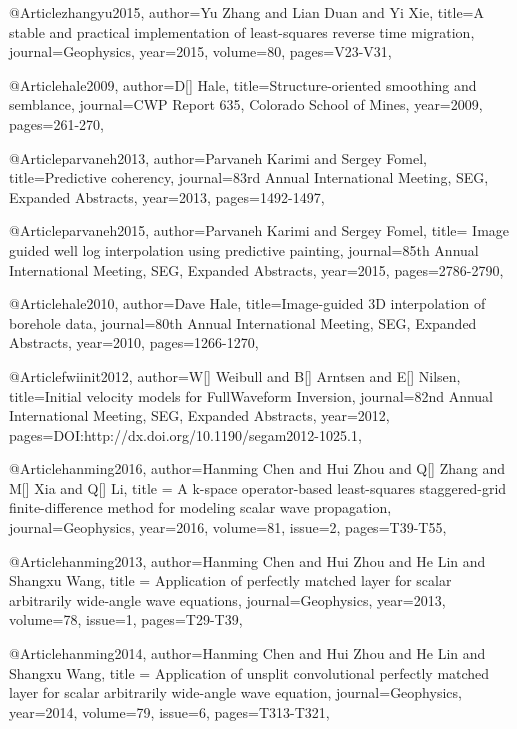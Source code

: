 {@Article{zhangyu2015,
  author={Yu Zhang and Lian Duan and Yi Xie},
  title={A stable and practical implementation of least-squares reverse time migration},
  journal={Geophysics},
  year=2015,
  volume=80,
  pages={V23-V31},
}
	




@Article{hale2009,
  author={D[] Hale},
  title={Structure-oriented smoothing and semblance},
  journal={CWP Report 635, Colorado School of Mines},
  year=2009,
  pages={261-270},
}


@Article{parvaneh2013,
  author={Parvaneh Karimi and Sergey Fomel},
  title={Predictive coherency},
  journal={83rd Annual International Meeting, SEG, Expanded Abstracts},
  year=2013,
  pages={1492-1497},
}

@Article{parvaneh2015,
  author={Parvaneh Karimi and Sergey Fomel},
  title={	Image guided well log interpolation using predictive painting},
  journal={85th Annual International Meeting, SEG, Expanded Abstracts},
  year=2015,
  pages={2786-2790},
}

@Article{hale2010,
  author={Dave Hale},
  title={Image-guided 3{D} interpolation of borehole data},
  journal={80th Annual International Meeting, SEG, Expanded Abstracts},
  year=2010,
  pages={1266-1270},
}

@Article{fwiinit2012,
  author={W[] Weibull and B[] Arntsen and E[] Nilsen},
  title={Initial velocity models for FullWaveform Inversion},
  journal={82nd Annual International Meeting, SEG, Expanded Abstracts},
  year=2012,
  pages={DOI:http://dx.doi.org/10.1190/segam2012-1025.1},
}






@Article{hanming2016,
  author={Hanming Chen and Hui Zhou and Q[] Zhang and M[] Xia and Q[] Li},
  title = {A k-space operator-based least-squares staggered-grid finite-difference method for modeling scalar wave propagation},
  journal={Geophysics},
  year=2016,
  volume=81,
  issue=2,
  pages={T39-T55},
}

@Article{hanming2013,
  author={Hanming Chen and Hui Zhou and He Lin and Shangxu Wang},
  title = {Application of perfectly matched layer for scalar arbitrarily wide-angle wave equations},
  journal={Geophysics},
  year=2013,
  volume=78,
  issue=1,
  pages={T29-T39},
}

@Article{hanming2014,
  author={Hanming Chen and Hui Zhou and He Lin and Shangxu Wang},
  title = {Application of unsplit convolutional perfectly matched layer for scalar arbitrarily wide-angle wave equation},
  journal={Geophysics},
  year=2014,
  volume=79,
  issue=6,
  pages={T313-T321},
}

}
